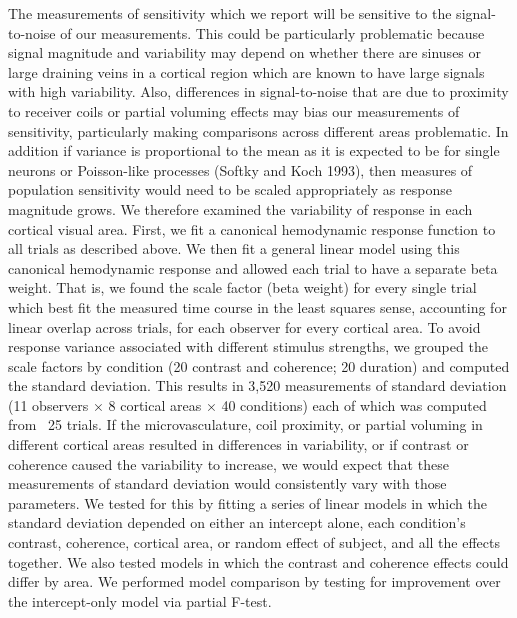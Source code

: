 \documentclass{report}
\begin{document}
The measurements of sensitivity which we report will be sensitive to the signal-to-noise of our measurements. This could be particularly problematic because signal magnitude and variability may depend on whether there are sinuses or large draining veins in a cortical region which are known to have large signals with high variability. Also, differences in signal-to-noise that are due to proximity to receiver coils or partial voluming effects may bias our measurements of sensitivity, particularly making comparisons across different areas problematic. In addition if variance is proportional to the mean as it is expected to be for single neurons or Poisson-like processes (Softky and Koch 1993), then measures of population sensitivity would need to be scaled appropriately as response magnitude grows. We therefore examined the variability of response in each cortical visual area. First, we fit a canonical hemodynamic response function to all trials as described above. We then fit a general linear model using this canonical hemodynamic response and allowed each trial to have a separate beta weight. That is, we found the scale factor (beta weight) for every single trial which best fit the measured time course in the least squares sense, accounting for linear overlap across trials, for each observer for every cortical area. To avoid response variance associated with different stimulus strengths, we grouped the scale factors by condition (20 contrast and coherence; 20 duration) and computed the standard deviation. This results in 3,520 measurements of standard deviation (11 observers × 8 cortical areas × 40 conditions) each of which was computed from ~25 trials. If the microvasculature, coil proximity, or partial voluming in different cortical areas resulted in differences in variability, or if contrast or coherence caused the variability to increase, we would expect that these measurements of standard deviation would consistently vary with those parameters. We tested for this by fitting a series of linear models in which the standard deviation depended on either an intercept alone, each condition’s contrast, coherence, cortical area, or random effect of subject, and all the effects together. We also tested models in which the contrast and coherence effects could differ by area. We performed model comparison by testing for improvement over the intercept-only model via partial F-test.
\end{document}
